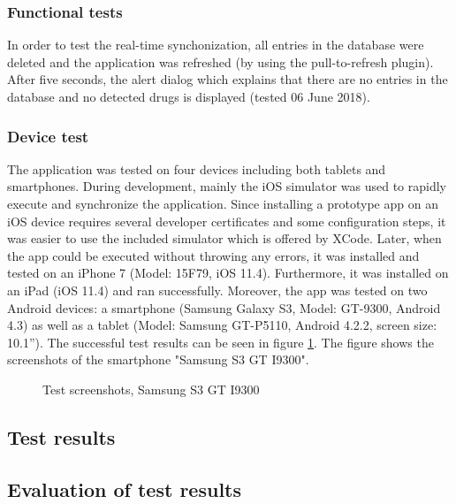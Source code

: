 \subsubsection{Functional tests}

In order to test the real-time synchonization, all entries in the database were deleted and the application was refreshed (by using the pull-to-refresh plugin). After five seconds, the alert dialog which explains that there are no entries in the database and no detected drugs is displayed (tested 06 June 2018). 

\subsubsection{Device test}

The application was tested on four devices including both tablets and smartphones. During development, mainly the iOS simulator was used to rapidly execute and synchronize the application. Since installing a prototype app on an iOS device requires several developer certificates and some configuration steps, it was easier to use the included simulator which is offered by XCode. 
Later, when the app could be executed without throwing any errors, it was installed and tested on an iPhone 7 (Model: 15F79, iOS 11.4). Furthermore, it was installed on an iPad (iOS 11.4) and ran successfully. 
Moreover, the app was tested on two Android devices: a smartphone (Samsung Galaxy S3, Model: GT-9300, Android 4.3) as well as a tablet (Model: Samsung GT-P5110, Android 4.2.2, screen size: 10.1'').
The successful test results can be seen in figure \ref{fig:s3_screenshots}. The figure shows the screenshots of the smartphone "Samsung S3 GT I9300".

\begin{figure}
\centering
\subfigure{\texttt{[image: s3\_01]}}
\subfigure{\texttt{[image: s3\_02]}}
\subfigure{\texttt{[image: s3\_03]}}
\subfigure{\texttt{[image: s3\_04]}}
\caption{\label{fig:s3_screenshots} Test screenshots, Samsung S3 GT I9300}
\end{figure}

\subsection{Test results}

\subsection{Evaluation of test results}

